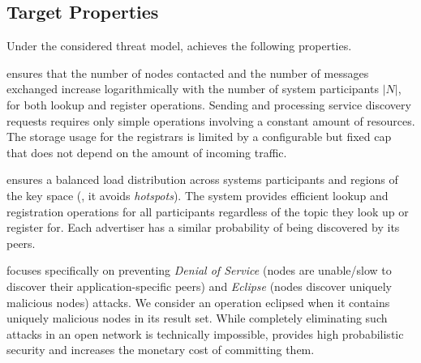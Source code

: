 
\subsection{Target Properties}

Under the considered threat model, \sysname achieves the following properties.

\sysname ensures that the number of nodes contacted and the number of messages exchanged increase logarithmically with the number of system participants $|N|$, for both lookup and register operations. 
Sending and processing service discovery requests requires only simple operations involving a constant amount of resources.
The storage usage for the registrars is limited by a configurable but fixed cap that does not depend on the amount of incoming traffic. 

\sysname ensures a balanced load distribution across systems participants and regions of the key space (\ie, it avoids \emph{hotspots}).
The system provides efficient lookup and registration operations for all participants regardless of the topic they look up or register for.
Each advertiser has a similar probability of being discovered by its peers. 

\sysname focuses specifically on preventing \emph{Denial of Service} (nodes are unable/slow to discover their application-specific peers) and \emph{Eclipse} (nodes discover uniquely malicious nodes) attacks. We consider an operation eclipsed when it contains uniquely malicious nodes in its result set.
While completely eliminating such attacks in an open network is technically impossible, \sysname provides high probabilistic security 
and increases the monetary cost of committing them. 


